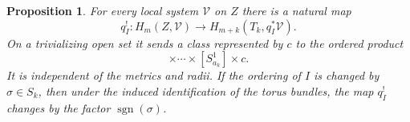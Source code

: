 \documentclass[12pt]{amsart}
\numberwithin{equation}{section}
\theoremstyle{plain}
\newtheorem{proposition}[theorem]{Proposition}
\theoremstyle{definition}
\theoremstyle{remark}
\theoremstyle{definition}
\DeclareMathOperator{\sgn}{sgn}
\begin{document}
\begin{proposition}
\label{prop:ordered-torus-umkehr}
For every local system $\mathcal V$ on $Z$ there is a natural map
\begin{equation*}
q_I^!:H_m(Z,\mathcal V)\to 
 H_{m+k}(T_k,q_I^*\mathcal V).
\end{equation*}
On a trivializing open set it sends a class represented by $c$ to the ordered product
\begin{equation*}
[S^1_{a_1}]\times\cdots\times[S^1_{a_k}]\times c.
\end{equation*}
It is independent of the metrics and radii. If the ordering of $I$ is changed by $\sigma\in S_k$, then under the induced identification of the torus bundles, the map $q_I^!$ changes by the factor $\sgn(\sigma)$.
\end{proposition}
\end{document}
